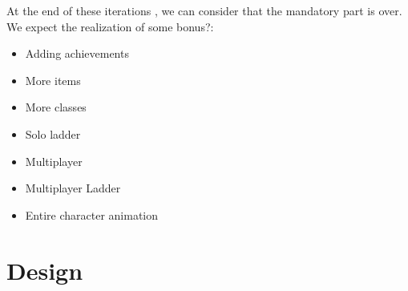 \documentclass[16pt, oneside]{report}
\begin{document}
At the end of these iterations , we can consider that the mandatory part is over. We expect the realization of some bonus?: \\
\begin{itemize}
	\item	Adding achievements
	\item	More items
	\item	More classes
	\item	Solo ladder
	\item Multiplayer
	\item	 Multiplayer Ladder
	\item	Entire character animation
\end{itemize}

\chapter{Design}
\end{document}
